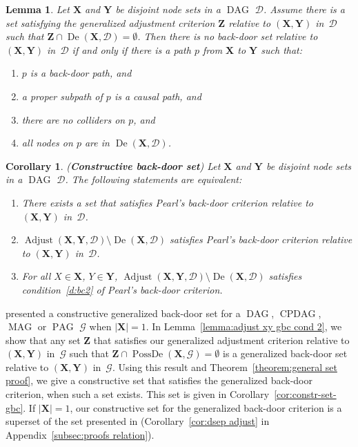 \documentclass[11pt,a4paper]{article}
\newtheorem{lemma}[definition]{Lemma}
\newtheorem{corollary}[definition]{Corollary}
\DeclareMathOperator{\CPDAG}{CPDAG}
\DeclareMathOperator{\DAG}{DAG}
\DeclareMathOperator{\MAG}{MAG}
\DeclareMathOperator{\PAG}{PAG}
\DeclareMathOperator{\PossDe}{PossDe}
\DeclareMathOperator{\De}{De}
\DeclareMathOperator{\Adjust}{Adjust}
\newcommand{\g}[1][G]{\mathcal{#1}}
\newcommand{\adjustb}[2][X,Y]{\Adjust(\mathbf{#1},#2)}
\begin{document}
\begin{lemma}
Let $\mathbf{X}$ and $\mathbf{Y}$ be disjoint node sets in a $\DAG$ $\g[D]$. Assume there is a set satisfying the generalized adjustment criterion $\mathbf{Z}$ relative to $(\mathbf{X,Y})$ in~$\g[D]$ such that $\mathbf{Z} \cap \De(\mathbf{X},\g[D])=\emptyset$. Then there is no back-door set relative to $(\mathbf{X,Y})$ in~$\g[D]$ if and only if there is a path $p$ from $\mathbf{X}$ to $\mathbf{Y}$ such that:
\begin{enumerate}[label=(\roman*)]
\item\label{l:gbc-bc1} $p$ is a back-door path, and
\item\label{l:gbc-bc2} a proper subpath of $p$ is a causal path, and
\item\label{l:gbc-bc3} there are no colliders on $p$, and
\item\label{l:gbc-bc4} all nodes on $p$ are in $\De(\mathbf{X},\g[D])$.
\end{enumerate}
\label{lemma:gbc bc}
\end{lemma}
\begin{corollary}(\textbf{Constructive back-door set})
Let $\mathbf{X}$ and $\mathbf{Y}$ be disjoint node sets in a $\DAG$ $\g[D]$.
The following statements are equivalent:
\begin{enumerate} [label = (\roman*)]
\item\label{constr-bc-1} There exists a set that satisfies Pearl's back-door criterion relative to $(\mathbf{X,Y})$ in~$\g[D]$.
\item\label{constr-bc-2} $\adjustb{\g[D]}\setminus \De(\mathbf{X},\g[D])$ satisfies Pearl's back-door criterion relative to $(\mathbf{X,Y})$ in~$\g[D]$.
\item\label{constr-bc-3} 
For all $X \in \mathbf{X}$, $Y \in \mathbf{Y}$, $\adjustb{\g[D]} \setminus \De(\mathbf{X},\g[D])$ satisfies condition~\ref{d:bc2} of Pearl's back-door criterion.
\end{enumerate}
\label{cor:constr-bc}
\end{corollary}



\citet{maathuis2013generalized} presented a constructive generalized back-door set for a $\DAG$, $\CPDAG$, $\MAG$ or $\PAG$ $\g$ when $|\mathbf{X}| = 1$. In Lemma~\ref{lemma:adjust xy gbc cond 2}, we show that any set $\mathbf{Z}$ that satisfies our generalized adjustment criterion relative to $(\mathbf{X,Y})$ in~$\g$ such that $\mathbf{Z} \cap \PossDe(\mathbf{X},\g) = \emptyset$ is a generalized back-door set relative to $(\mathbf{X,Y})$ in~$\g$. Using this result and  Theorem~\ref{theorem:general set proof}, we give a constructive set that satisfies the generalized back-door criterion, when such a set exists. This set is given in Corollary~\ref{cor:constr-set-gbc}.
If $|\mathbf{X}| = 1$, our constructive set for the generalized back-door criterion is a superset of the set presented in \citet{maathuis2013generalized} (Corollary~\ref{cor:dsep adjust} in Appendix~\ref{subsec:proofs relation}).
\end{document}
